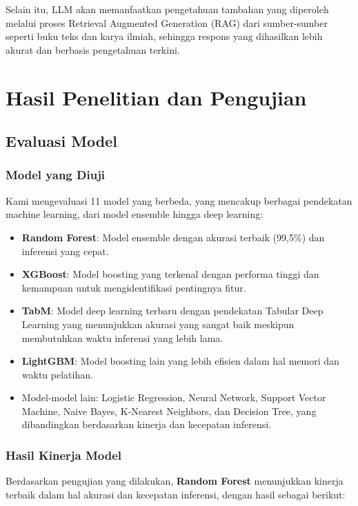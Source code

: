 \documentclass{article} %
\begin{document}
Selain itu, LLM akan memanfaatkan pengetahuan tambahan yang diperoleh melalui proses Retrieval Augmented Generation (RAG) dari sumber-sumber seperti buku teks dan karya ilmiah, sehingga respons yang dihasilkan lebih akurat dan berbasis pengetahuan terkini.


\section{Hasil Penelitian dan Pengujian}

\subsection{Evaluasi Model}

\subsubsection{Model yang Diuji}

Kami mengevaluasi 11 model yang berbeda, yang mencakup berbagai pendekatan machine learning, dari model ensemble hingga deep learning:

\begin{itemize}
    \item \textbf{Random Forest}: Model ensemble dengan akurasi terbaik (99,5\%) dan inferensi yang cepat.
    \item \textbf{XGBoost}: Model boosting yang terkenal dengan performa tinggi dan kemampuan untuk mengidentifikasi pentingnya fitur.
    \item \textbf{TabM}: Model deep learning terbaru dengan pendekatan Tabular Deep Learning yang menunjukkan akurasi yang sangat baik meskipun membutuhkan waktu inferensi yang lebih lama.
    \item \textbf{LightGBM}: Model boosting lain yang lebih efisien dalam hal memori dan waktu pelatihan.
    \item Model-model lain: Logistic Regression, Neural Network, Support Vector Machine, Naive Bayes, K-Nearest Neighbors, dan Decision Tree, yang dibandingkan berdasarkan kinerja dan kecepatan inferensi.
\end{itemize}

\subsubsection{Hasil Kinerja Model}

Berdasarkan pengujian yang dilakukan, \textbf{Random Forest} menunjukkan kinerja terbaik dalam hal akurasi dan kecepatan inferensi, dengan hasil sebagai berikut:
\end{document}
